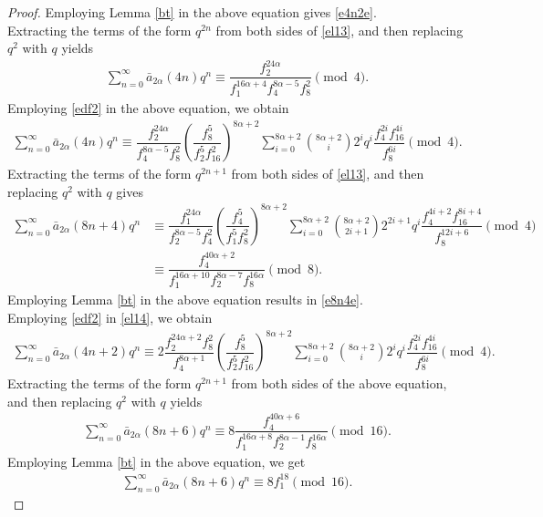 \documentclass[11pt,a4paper]{article}
\numberwithin{equation}{section}
\theoremstyle{plain}
\begin{document}
\begin{proof}
		Employing Lemma \ref{bt} in the above equation gives \eqref{e4n2e}.\\
	\indent	Extracting the terms of the form $q^{2n}$ from both sides of \eqref{el13}, and then replacing $q^{2}$ with $q$ yields
		\begin{align*}
		\sum_{n=0}^{\infty}\bar{a}_{2\alpha}(4n)q^n\equiv \dfrac{f_2^{24\alpha}}{f_1^{16\alpha+4}f_4^{8\alpha-5}f_8^2}\pmod 4.
		\end{align*}
		Employing \eqref{edf2} in the above equation, we obtain
		\begin{align*}
		\sum_{n=0}^{\infty}\bar{a}_{2\alpha}(4n)q^n\equiv \dfrac{f_2^{24\alpha}}{f_4^{8\alpha-5}f_8^2}\left(\dfrac{f_8^5}{f_2^5f_{16}^2}\right)^{8\alpha+2}\sum_{i=0}^{8\alpha+2}\binom{8\alpha+2}{i}2^iq^i\dfrac{f_4^{2i}f_{16}^{4i}}{f_8^{6i}}\pmod 4.
		\end{align*}
		Extracting the terms of the form $q^{2n+1}$ from both sides of \eqref{el13}, and then replacing $q^{2}$ with $q$ gives
		\begin{align*}
		\sum_{n=0}^{\infty}\bar{a}_{2\alpha}(8n+4)q^n&\equiv\dfrac{f_1^{24\alpha}}{f_2^{8\alpha-5}f_4^2}\left(\dfrac{f_4^5}{f_1^5f_8^2}\right)^{8\alpha+2}\sum_{i=0}^{8\alpha+2}\binom{8\alpha+2}{2i+1}2^{2i+1}q^i\dfrac{f_4^{4i+2}f_{16}^{8i+4}}{f_8^{12i+6}}\pmod 4\\
		&\equiv \dfrac{f_4^{40\alpha+2}}{f_1^{16\alpha+10}f_2^{8\alpha-7}f_8^{16\alpha}}\pmod 8.
		\end{align*}
		Employing Lemma \ref{bt} in the above equation results in \eqref{e8n4e}.\\
		\indent Employing \eqref{edf2} in \eqref{el14}, we obtain
		\begin{align*}
		\sum_{n=0}^{\infty}\bar{a}_{2\alpha}(4n+2)q^n\equiv 2\dfrac{f_2^{24\alpha+2}f_8^2}{f_4^{8\alpha+1}}\left(\dfrac{f_8^5}{f_2^5f_{16}^2}\right)^{8\alpha+2}\sum_{i=0}^{8\alpha+2}\binom{8\alpha+2}{i}2^iq^i\dfrac{f_4^{2i}f_{16}^{4i}}{f_8^{6i}}\pmod 4.
		\end{align*}
		Extracting the terms of the form $q^{2n+1}$ from both sides of the above equation, and then replacing $q^{2}$ with $q$ yields
		\begin{align*}
		\sum_{n=0}^{\infty}\bar{a}_{2\alpha}(8n+6)q^n\equiv 8\dfrac{f_4^{40\alpha+6}}{f_1^{16\alpha+8}f_2^{8\alpha-1}f_8^{16\alpha}}\pmod{16}.
		\end{align*}
			Employing Lemma \ref{bt} in the above equation, we get
		\begin{align}\label{el15}
			\sum_{n=0}^{\infty}\bar{a}_{2\alpha}(8n+6)q^n\equiv 8f_1^{18}\pmod{16}.

\end{align}
\end{proof}
\end{document}
